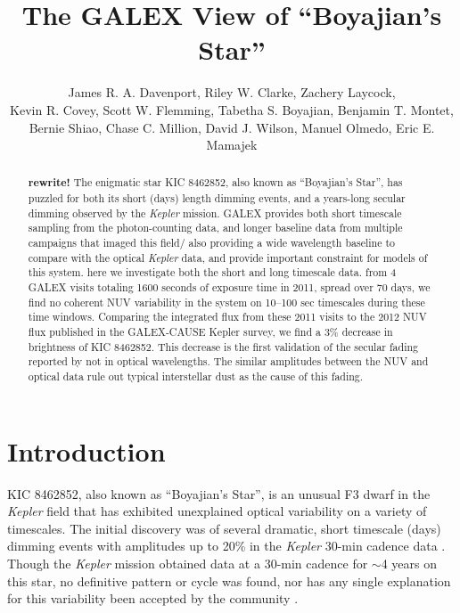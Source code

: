 \documentclass[twocolumn]{aastex6}
\newcommand{\Kepler}{\textsl{Kepler}\xspace}
\begin{document}
\title{The GALEX View of ``Boyajian's Star''}


\author{
	James R. A. Davenport,
	Riley W. Clarke,
	Zachery Laycock,\\
	Kevin R. Covey,
	Scott W. Flemming,
	Tabetha S. Boyajian,
	Benjamin T. Montet,\\
	Bernie Shiao,
	Chase C. Million,
	David J. Wilson,
	Manuel Olmedo,
	Eric E. Mamajek
	}

 

 

\begin{abstract}
{\bf rewrite!}
The enigmatic star KIC 8462852, also known as ``Boyajian's Star'',  has puzzled for both its short (days) length dimming events, and a years-long secular dimming observed by the \Kepler mission.
GALEX provides both short timescale sampling from the photon-counting data, and longer baseline data from multiple campaigns that imaged this field/ also providing a wide wavelength baseline to compare with the optical \Kepler data, and provide important constraint for models of this system.
here we investigate both the short and long timescale data. from 4 GALEX visits totaling 1600 seconds of exposure time in 2011, spread over 70 days, we find no coherent NUV variability in the system on 10--100 sec timescales during these time windows. Comparing the integrated flux from these 2011 visits to the 2012 NUV flux published in the GALEX-CAUSE Kepler survey, we find a 3\% decrease in brightness of KIC 8462852. This decrease is the first  validation of the secular fading reported by \citet{montet2016} not in optical wavelengths. The similar amplitudes between the NUV and optical data rule out typical interstellar dust as the cause of this fading.
\end{abstract}



\section{Introduction}
KIC 8462852, also known as ``Boyajian's Star'', is an unusual F3 dwarf in the \Kepler field that has exhibited unexplained optical variability on a variety of timescales. The initial discovery was of several dramatic, short timescale (days) dimming events with amplitudes up to 20\% in the \Kepler 30-min cadence data \citep{boyajian2015}. Though the \Kepler mission \citep{borucki2010} obtained data at a 30-min cadence for $\sim$4 years on this star, no definitive pattern or cycle was found, nor has any single explanation for this variability been accepted by the community \citep{wright2016b}.
\end{document}
